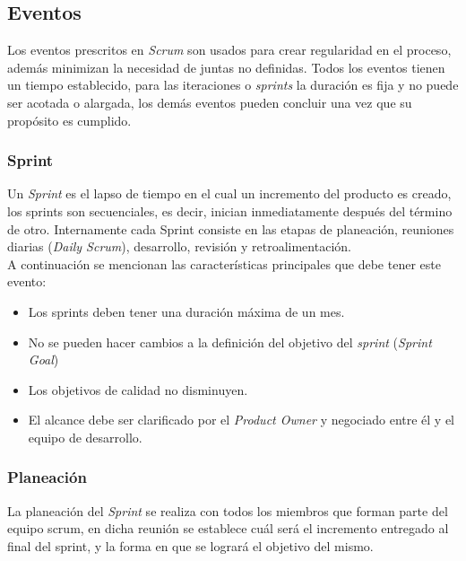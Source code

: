 \subsection{Eventos}

 Los eventos prescritos en {\it Scrum} son usados para crear regularidad en el proceso, además
 minimizan la necesidad de juntas no definidas. Todos los eventos tienen un tiempo establecido, 
 para las iteraciones o {\it sprints} la duración es fija y no puede ser acotada o alargada, los
 demás eventos pueden concluir una vez que su propósito es cumplido.

\subsubsection{Sprint}

 Un {\it Sprint} es el lapso de tiempo en el cual un incremento del producto es creado, los sprints
 son secuenciales, es decir, inician inmediatamente después del término de otro. Internamente 
 cada Sprint consiste en las etapas de planeación, reuniones diarias ({\it Daily Scrum}),
 desarrollo, revisión y retroalimentación.\\

 \noindent A continuación se mencionan las características principales que debe tener este evento:

    \begin{itemize}
    \item Los sprints deben tener una duración máxima de un mes.
    \item No se pueden hacer cambios a la definición del objetivo del {\it sprint} ({\it Sprint Goal})
    \item Los objetivos de calidad no disminuyen.
    \item El alcance debe ser clarificado por el {\it Product Owner} y negociado entre él y el equipo
           de desarrollo.
    \end{itemize}
    

    
\subsubsection{Planeación}

 La planeación del {\it Sprint} se realiza con todos los miembros que forman parte del equipo scrum,
 en dicha reunión se establece cuál será el incremento entregado al final del sprint, y la forma
 en que se logrará el objetivo del mismo.\\

